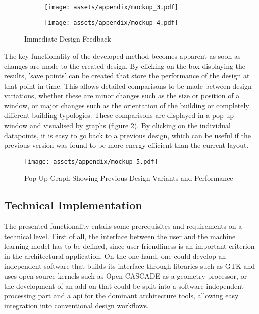 \documentclass[a4paper, 12pt]{report}
\begin{document}
\begin{figure}
\centering
\begin{subfigure}{.49\textwidth}
\centering
\texttt{[image: assets/appendix/mockup\_3.pdf]}
\end{subfigure}
\begin{subfigure}{.49\textwidth}
\centering
\texttt{[image: assets/appendix/mockup\_4.pdf]}
\end{subfigure}
\caption{Immediate Design Feedback}
\label{fig:immediate-design-feedback}
\end{figure}

The key functionality of the developed method becomes apparent as soon as changes are made to the created design. By clicking on the box displaying the results, 'save points' can be created that store the performance of the design at that point in time. This allows detailed comparisons to be made between design variations, whether these are minor changes such as the size or position of a window, or major changes such as the orientation of the building or completely different building typologies. These comparisons are displayed in a pop-up window and visualised by graphs (figure \ref{fig:pop-up-graph-showing-previous-design-variants-and-performance}). By clicking on the individual datapoints, it is easy to go back to a previous design, which can be useful if the previous version was found to be more energy efficient than the current layout.

\begin{figure}
\centering
\texttt{[image: assets/appendix/mockup\_5.pdf]}
\caption{Pop-Up Graph Showing Previous Design Variants and Performance}
\label{fig:pop-up-graph-showing-previous-design-variants-and-performance}
\end{figure}

\subsection{Technical Implementation}\label{subsec:technical-implementation}

The presented functionality entails some prerequisites and requirements on a technical level. First of all, the interface between the user and the machine learning model has to be defined, since user-friendliness is an important criterion in the architectural application. On the one hand, one could develop an independent software that builds its interface through libraries such as GTK and uses \gls{open source} kernels such as Open CASCADE as a geometry processor, or the development of an add-on that could be split into a software-independent processing part and a \acrshort{api} for the dominant architecture tools, allowing easy integration into conventional design workflows.
\end{document}
